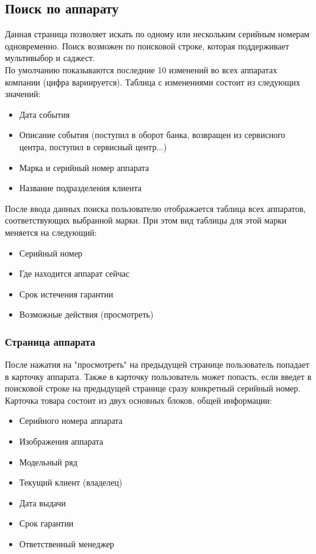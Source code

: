 \documentclass[DIV=calc, paper=a4, fontsize=11pt]{scrartcl} %
\begin{document}
\subsection{Поиск по аппарату}
Данная страница позволяет искать по одному или нескольким серийным номерам одновременно. Поиск возможен по поисковой строке, которая поддерживает мультивыбор и саджест.
\\[0.5cm]
По умолчанию показываются последние 10 изменений во всех аппаратах компании (цифра вариируется). Таблица с изменениями состоит из следующих значений:

\begin{itemize}
	\item Дата события
	\item Описание события (поступил в оборот банка, возвращен из сервисного центра, поступил в сервисный центр...)
	\item Марка и серийный номер аппарата
	\item Название подразделения клиента
\end{itemize}

После ввода данных поиска пользователю отображается таблица всех аппаратов, соответствующих выбранной марки. При этом вид таблицы для этой марки меняется на следующий:

\begin{itemize}
	\item Серийный номер
	\item Где находится аппарат сейчас
	\item Срок истечения гарантии
	\item Возможные действия (просмотреть)
\end{itemize}

\subsubsection{Страница аппарата}
После нажатия на "просмотреть" на предыдущей странице пользователь попадает в карточку аппарата. Также в карточку пользователь может попасть, если введет в поисковой строке на предыдущей странице сразу конкретный серийный номер.
\\[0.5cm]
Карточка товара состоит из двух основных блоков, общей информации:

\begin{itemize}
	\item Серийного номера аппарата
	\item Изображения аппарата
	\item Модельный ряд
	\item Текущий клиент (владелец)
	\item Дата выдачи
	\item Срок гарантии
	\item Ответственный менеджер
\end{itemize}
\end{document}
